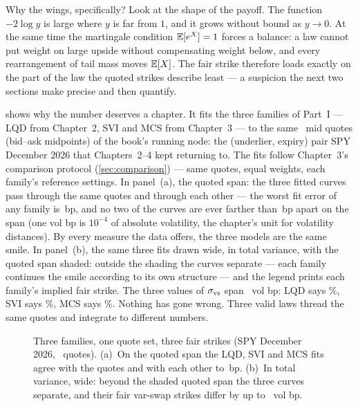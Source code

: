 Why the wings, specifically?  Look at the shape of the payoff.  The
function $-2\log y$ is large where $y$ is far from $1$, and it grows
without bound as $y\to0$.  At the same time the martingale condition
$\mathbb{E}[e^X]=1$ forces a balance: a law cannot put weight on large upside
without compensating weight below, and every rearrangement of tail
mass moves $\mathbb{E}[X]$.  The fair strike therefore loads exactly on the
part of the law the quoted strikes describe least --- a suspicion the
next two sections make precise and then quantify.

 shows why the number deserves a chapter.  It fits
the three families of Part~I --- LQD from Chapter~2, SVI and MCS from
Chapter~3 --- to the same \MacVsPinsNQuotes\ mid quotes (bid--ask
midpoints) of the book's running node: the (underlier, expiry) pair
SPY December 2026 that Chapters~2--4 kept returning to.  The fits
follow Chapter~3's comparison protocol (\cref{sec:comparison}) ---
same quotes, equal weights, each family's reference settings.  In
panel~(a), the quoted span: the three fitted curves pass through the
same quotes and through each other --- the worst fit error of any
family is \MacVsPinsWorstRmsBp\,bp, and no two of the curves are ever
farther than \MacVsPinsBellyAgreeBp\,bp apart on the span (one vol bp
is $10^{-4}$ of absolute volatility, the chapter's unit for
volatility distances).  By every measure the data offers, the three models
are the same smile.  In panel~(b), the same three fits drawn wide, in
total variance, with the quoted span shaded: outside the shading the
curves separate --- each family continues the smile according to its
own structure --- and the legend prints each family's implied fair
strike.  The three values of $\sigma_{\rm vs}$ span
\MacVsPinsMaxGapBp\ vol bp: LQD says \MacVsPinsLqdPct\%, SVI says
\MacVsPinsSviPct\%, MCS says \MacVsPinsMcsPct\%.  Nothing has gone
wrong.  Three valid laws thread the same quotes and integrate to
different numbers.

\begin{figure}[htbp]
\centering
{}
\caption{Three families, one quote set, three fair strikes (SPY
December 2026, \MacVsPinsNQuotes\ quotes).  (a)~On the quoted span the
LQD, SVI and MCS fits agree with the quotes and with each other to
\MacVsPinsBellyAgreeBp\,bp.  (b)~In total variance, wide: beyond the
shaded quoted span the three curves separate, and their fair var-swap
strikes differ by up to \MacVsPinsMaxGapBp\ vol bp.}
\label{fig:vspins}
\end{figure}

